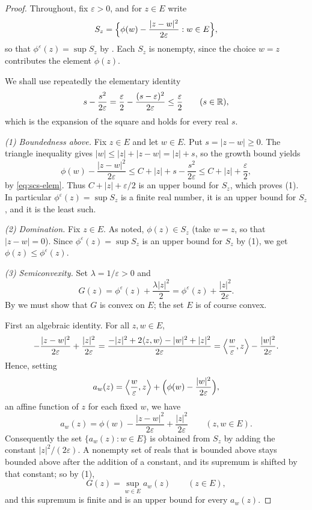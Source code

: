 \begin{proof}
Throughout, fix $\varepsilon>0$, and for $z\in E$ write
\[
  S_z=\Bigl\{\phi(w)-\frac{|z-w|^2}{2\varepsilon}:w\in E\Bigr\},
\]
so that $\phi^\varepsilon(z)=\sup S_z$ by . Each $S_z$ is
nonempty, since the choice $w=z$ contributes the element $\phi(z)$.

We shall use repeatedly the elementary identity
\begin{equation}\label{eq:scs-elem}
  s-\frac{s^2}{2\varepsilon}
   =\frac{\varepsilon}{2}-\frac{(s-\varepsilon)^2}{2\varepsilon}
   \le\frac{\varepsilon}{2}
  \qquad(s\in\mathbb{R}),
\end{equation}
which is the expansion of the square and holds for every real $s$.

\emph{(1) Boundedness above.}
Fix $z\in E$ and let $w\in E$. Put $s=|z-w|\ge0$. The triangle inequality gives
$|w|\le|z|+|z-w|=|z|+s$, so the growth bound yields
\[
  \phi(w)-\frac{|z-w|^2}{2\varepsilon}
   \le C+|z|+s-\frac{s^2}{2\varepsilon}
   \le C+|z|+\frac{\varepsilon}{2},
\]
by \eqref{eq:scs-elem}. Thus $C+|z|+\varepsilon/2$ is an upper bound for $S_z$,
which proves (1). In particular $\phi^\varepsilon(z)=\sup S_z$ is a finite real
number, it is an upper bound for $S_z$, and it is the least such.

\emph{(2) Domination.}
Fix $z\in E$. As noted, $\phi(z)\in S_z$ (take $w=z$, so that
$|z-w|=0$). Since $\phi^\varepsilon(z)=\sup S_z$ is an upper bound for $S_z$ by
(1), we get $\phi(z)\le\phi^\varepsilon(z)$.

\emph{(3) Semiconvexity.}
Set $\lambda=1/\varepsilon>0$ and
\[
  G(z)=\phi^\varepsilon(z)+\frac{\lambda|z|^2}{2}
      =\phi^\varepsilon(z)+\frac{|z|^2}{2\varepsilon}.
\]
By  we must show that $G$ is convex on $E$; the set
$E$ is of course convex.

First an algebraic identity. For all $z,w\in E$,
\[
  -\frac{|z-w|^2}{2\varepsilon}+\frac{|z|^2}{2\varepsilon}
   =\frac{-|z|^2+2\langle z,w\rangle-|w|^2+|z|^2}{2\varepsilon}
   =\Bigl\langle \frac{w}{\varepsilon},z\Bigr\rangle-\frac{|w|^2}{2\varepsilon}.
\]
Hence, setting
\[
  a_w(z)=\Bigl\langle\frac{w}{\varepsilon},z\Bigr\rangle
          +\Bigl(\phi(w)-\frac{|w|^2}{2\varepsilon}\Bigr),
\]
an affine function of $z$ for each fixed $w$, we have
\begin{equation}\label{eq:scs-affine}
  a_w(z)=\phi(w)-\frac{|z-w|^2}{2\varepsilon}+\frac{|z|^2}{2\varepsilon}
  \qquad(z,w\in E).
\end{equation}
Consequently the set $\{a_w(z):w\in E\}$ is obtained from $S_z$ by adding the
constant $|z|^2/(2\varepsilon)$. A nonempty set of reals that is bounded above
stays bounded above after the addition of a constant, and its supremum is
shifted by that constant; so by (1),
\begin{equation}\label{eq:scs-G}
  G(z)=\sup_{w\in E}a_w(z)\qquad(z\in E),
\end{equation}
and this supremum is finite and is an upper bound for every $a_w(z)$.


\end{proof}
